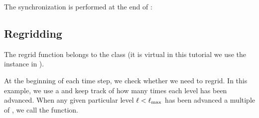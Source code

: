 \documentclass[letterpaper,10pt,english]{sphinxmanual}
\begin{document}
\sphinxAtStartPar
The synchronization is performed at the end of :

\begin{sphinxVerbatim}[commandchars=\\\{\}]
 
    \PYG{p}{[}\PYG{p}{]}\PYG{p}{[}\PYG{p}{]}    \PYG{p}{[}\PYG{p}{]}
                            \PYG{p}{[}\PYG{p}{]}

 
\end{sphinxVerbatim}


\subsection{Regridding}
\label{\detokenize{AmrCore:regridding}}\label{\detokenize{AmrCore:ss-regridding}}
\sphinxAtStartPar
The regrid function belongs to the  class (it is virtual \textendash{} in this
tutorial we use the instance in ).

\sphinxAtStartPar
At the beginning of each time step, we check whether we need to regrid.
In this example, we use a  and keep track of how many times each level
has been advanced. When any given particular level \(\ell<\ell_{\rm max}\) has been
advanced a multiple of , we call the  function.
\end{document}
